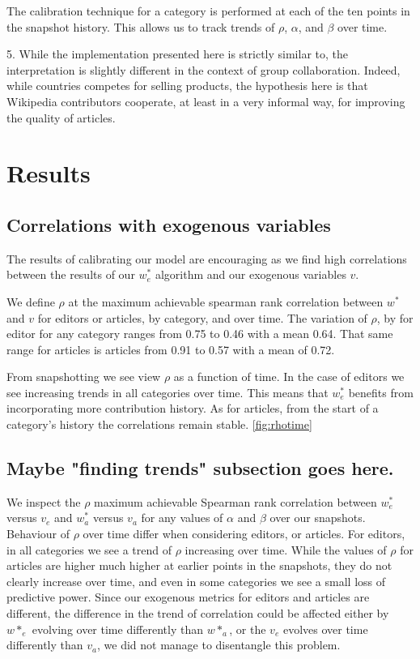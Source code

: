 \documentclass{acm_proc_article-sp}
\begin{document}
The calibration technique for a category is performed at each of the ten points in the snapshot history. This allows us to track trends of $\rho$, $\alpha$, and $\beta$ over time.



5. While the implementation presented here is strictly similar to, the interpretation is slightly different in the context of group collaboration. Indeed, while countries competes for selling products, the hypothesis here is that Wikipedia contributors cooperate, at least in a very informal way, for improving the quality of articles.




\section{Results}


\subsection{Correlations with exogenous variables}

The results of calibrating our model are encouraging as we find high correlations between the results of our $w^*_e$ algorithm and our exogenous variables $v$. 

We define $\rho$ at the maximum achievable spearman rank correlation between $w^*$ and $v$ for editors or articles, by category, and over time. The variation of $\rho$, by for editor for any category ranges from 0.75 to 0.46 with a mean 0.64.  That same range for articles is articles from 0.91 to 0.57 with a mean of 0.72.

 
From snapshotting we see view $\rho$ as  a function of time. In the case of editors we see increasing trends in all categories over time. This means that $w^*_e$ benefits from incorporating more contribution history. As for articles, from the start of a category's history the correlations remain stable. \ref{fig:rhotime}

\subsection{Maybe "finding trends" subsection goes here.}
We inspect the $\rho$ maximum achievable  Spearman rank correlation between $w^*_e$ versus $v_e$ and $w^*_a$ versus $v_a$ for any values of $\alpha$ and $\beta$ over our snapshots. Behaviour of $\rho$ over time differ when considering editors, or articles. For editors, in all categories we see a trend of $\rho$ increasing over time. While the values of $\rho$ for articles are higher much higher at earlier points in the snapshots, they do not clearly increase over time, and even in some categories we see a small loss of predictive power. Since our exogenous metrics for editors and articles are different, the difference in the trend of correlation could be affected either by $w*_e$ evolving over time differently than $w*_a$, or the $v_e$ evolves over time differently than $v_a$, we did not manage to disentangle this problem.
\end{document}
